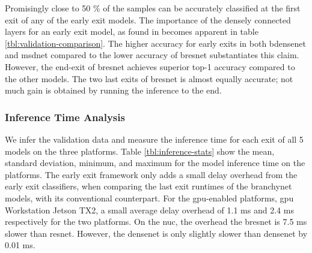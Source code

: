 Promisingly close to 50 \% of the samples can be accurately classified at the first exit of any of the early exit models. The importance of the densely connected layers for an early exit model, as found in \cite{huang_multi-scale_2017} becomes apparent in table \ref{tbl:validation-comparison}. The higher accuracy for early exits in both \gls{bdensenet} and \gls{msdnet} compared to the lower accuracy of \gls{bresnet} substantiates this claim. However, the end-exit of \gls{bresnet} achieves superior top-1 accuracy compared to the other models. The two last exits of \gls{bresnet} is almost equally accurate; not much gain is obtained by running the inference to the end.  
\subsubsection{Inference Time Analysis}
We infer the validation data and measure the inference time for each exit of all 5 models on the three platforms. Table \ref{tbl:inference-stats} show the mean, standard deviation, minimum, and maximum for the model inference time on the platforms. The early exit framework only adds a small delay overhead from the early exit classifiers, when comparing the last exit runtimes of the \gls{branchynet} models, with its conventional counterpart. For the \gls{gpu}-enabled platforms, \gls{gpu} Workstation Jetson TX2, a small average delay overhead of 1.1 ms and 2.4 ms respectively for the two platforms. On the \gls{nuc}, the overhead the \gls{bresnet} is  7.5 ms slower than \gls{resnet}. However, the \gls{densenet} is only slightly slower than \gls{densenet} by 0.01 ms.   
